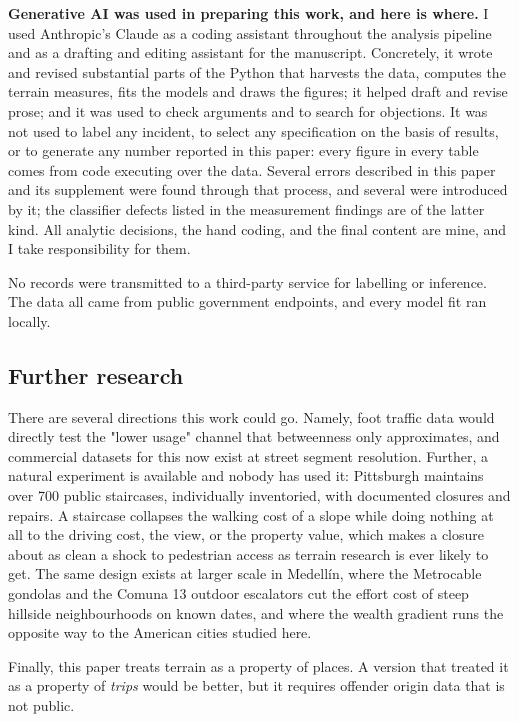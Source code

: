 \documentclass[11pt,letterpaper]{article}
\begin{document}
\textbf{Generative AI was used in preparing this work, and here is where.} I used
Anthropic's Claude as a coding assistant throughout the analysis pipeline and as a
drafting and editing assistant for the manuscript. Concretely, it wrote and revised
substantial parts of the Python that harvests the data, computes the terrain
measures, fits the models and draws the figures; it helped draft and revise prose;
and it was used to check arguments and to search for objections. It was not used to
label any incident, to select any specification on the basis of results, or to
generate any number reported in this paper: every figure in every table comes from
code executing over the data. Several errors described in this paper and its
supplement were found through that process, and several were introduced by it; the
classifier defects listed in the measurement findings are of the latter kind. All
analytic decisions, the hand coding, and the final content are mine, and I take
responsibility for them.

No records were transmitted to a third-party service for labelling or inference. The
data all came from public government endpoints, and every model fit ran locally.


\subsection{Further research}

There are several directions this work could go. Namely, foot traffic data would
directly test the "lower usage" channel that betweenness only approximates, and
commercial datasets for this now exist at street segment resolution. Further, a
natural experiment is available and nobody has used it: Pittsburgh maintains over 700
public staircases, individually inventoried, with documented closures and repairs.
A staircase collapses the walking cost of a slope while doing nothing at all to the
driving cost, the view, or the property value, which makes a closure about as clean a
shock to pedestrian access as terrain research is ever likely to get. The same design
exists at larger scale in Medellín, where the Metrocable gondolas and the Comuna 13
outdoor escalators cut the effort cost of steep hillside neighbourhoods on known dates,
and where the wealth gradient runs the opposite way to the American cities studied
here.

Finally, this paper treats terrain as a property of places. A version that treated it
as a property of \emph{trips} would be better, but it requires offender origin data
that is not public.
\end{document}
